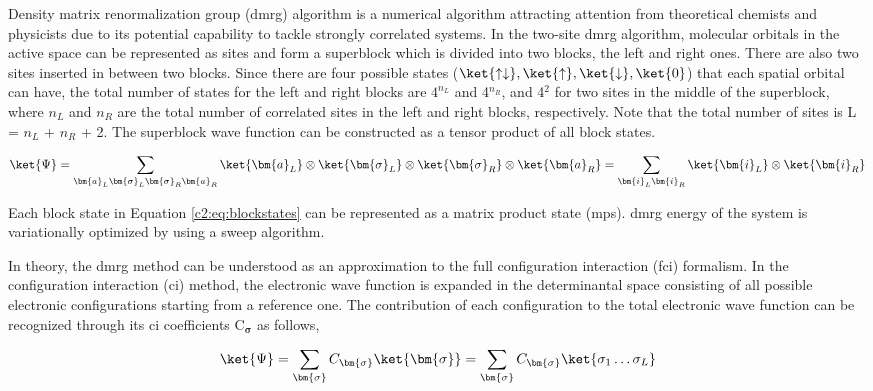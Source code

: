 \begin{refsection}
Density matrix renormalization group (\acrshort{dmrg}) algorithm is a numerical algorithm attracting attention from theoretical chemists and physicists due to its potential capability to tackle strongly correlated systems. \cite{dmrg1, dmrg2, dmrg3, dmrg4, dmrg5, dmrg6, dmrg7} In the two-site \acrshort{dmrg} algorithm, molecular orbitals in the active space can be represented as sites and form a superblock which is divided into two blocks, the left and right ones. There are also two sites inserted in between two blocks. Since there are four possible states ($\ket{\uparrow\downarrow}, \ket{\uparrow}, \ket{\downarrow}, \ket{0}$) that each spatial orbital can have, the total number of states for the left and right blocks are $4^{n_L}$ and 4$^{n_R}$, and  4$^2$ for two sites in the middle of the superblock, where $n_L$ and $n_R$ are the total number of correlated sites in the left and right blocks, respectively. Note that the total number of sites is L = $n_L$ + $n_R$ + 2. The superblock wave function can be constructed as a tensor product of all block states. 


\begin{equation}
	\label{c2:eq:blockstates}
	\ket{\Psi} = \sum_{\bm{a}_L\bm{\sigma}_L\bm{\sigma}_R \bm{a}_R} \ket{\bm{a}_L} \otimes  \ket{\bm{\sigma}_L} \otimes \ket{\bm{\sigma}_R} \otimes \ket{\bm{a}_R} = \sum_{\bm{i}_L \bm{i}_R} \ket{\bm{i}_L} \otimes \ket{\bm{i}_R}
 \end{equation}

\noindent Each block state in Equation \ref{c2:eq:blockstates} can be represented as a matrix product state (\acrshort{mps}). \cite{dmrg13, dmrg14, dmrg15} \acrshort{dmrg} energy of the system is variationally optimized by using a sweep algorithm.


In theory, the \acrshort{dmrg} method can be understood as an approximation to the full configuration interaction (\acrshort{fci}) formalism. In the configuration interaction (\acrshort{ci}) method, the electronic wave function is expanded in the determinantal space consisting of all possible electronic configurations starting from a reference one. The contribution of each configuration to the total electronic wave function can be recognized through its \acrshort{ci} coefficients C$_{\bm{\sigma}}$ as follows,

\begin{equation}
	\ket{\Psi} = \sum_{\bm{\sigma}} C_{\bm{\sigma}} \ket{\bm{\sigma}} = \sum_{\bm{\sigma}} C_{\bm{\sigma}} \ket{\sigma_1\dots\sigma_L}
\end{equation}


\end{refsection}
